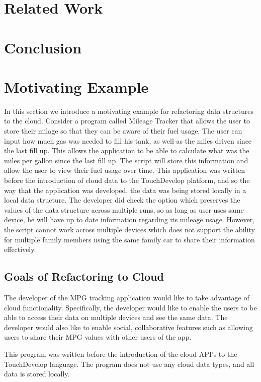 \documentclass{sigplanconf}
\begin{document}
\section{Related Work}

\section{Conclusion}



\section{Motivating Example}
\label{sec:motivatingExample}
In this section we introduce a motivating example for refactoring data structures to the cloud.   Consider a program called Mileage Tracker that allows the user to store their milage so that they can be aware of their fuel usage.  The user can input how much gas was needed to fill his tank, as well as the miles driven since the last fill up.  This allows the application to be able to calculate what was the miles per gallon since the last fill up.  The script will store this information and allow the user to view their fuel usage over time.  This application was written before the introduction of cloud data to the TouchDevelop platform, and so the way that the application was developed, the data was being stored locally in a local data structure.  The developer did check the option which preserves the values of the data structure across multiple runs, so as long as user uses same device, he will have up to date information regarding its mileage usage.  However, the script cannot work across multiple devices which does not support the ability for multiple family members using the same family car to share their information effectively.


\subsection{Goals of Refactoring to Cloud}
The developer of the MPG tracking application would like to take advantage of cloud functionality.  Specifically, the developer would like to enable the users to be able to access their data on multiple devices and see the same data. The developer would also like to enable social, collaborative features such as allowing users to share their MPG values with other users of the app.

This program was written before the introduction of the cloud API's to the TouchDevelop language.  The program does not use any cloud data types, and all data is stored locally.
\end{document}
